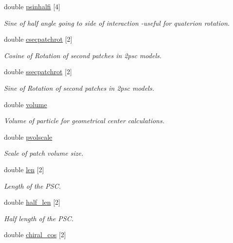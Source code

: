 \begin{DoxyCompactItemize}
double \hyperlink{class_ia__param_a52fcecbb5171074f634ebe68a1037d0d}{psinhalfi} \mbox{[}4\mbox{]}
\begin{DoxyCompactList}\small\item\em Sine of half angle going to side of interaction -\/useful for quaterion rotation. \end{DoxyCompactList}\item 
double \hyperlink{class_ia__param_a7f94789a785201573c04d8c5e71dc9fa}{csecpatchrot} \mbox{[}2\mbox{]}
\begin{DoxyCompactList}\small\item\em Cosine of Rotation of second patches in 2psc models. \end{DoxyCompactList}\item 
double \hyperlink{class_ia__param_a14afc5f0a2e7842923345b3724e329f2}{ssecpatchrot} \mbox{[}2\mbox{]}
\begin{DoxyCompactList}\small\item\em Sine of Rotation of second patches in 2psc models. \end{DoxyCompactList}\item 
double \hyperlink{class_ia__param_af19168047d88497117c70ff6672df1bf}{volume}
\begin{DoxyCompactList}\small\item\em Volume of particle for geometrical center calculations. \end{DoxyCompactList}\item 
double \hyperlink{class_ia__param_ae90674c64fb9e8d68e964114bb029709}{pvolscale}
\begin{DoxyCompactList}\small\item\em Scale of patch volume size. \end{DoxyCompactList}\item 
double \hyperlink{class_ia__param_a50f385d02c6d6c4dabec2c27f552b358}{len} \mbox{[}2\mbox{]}
\begin{DoxyCompactList}\small\item\em Length of the P\+S\+C. \end{DoxyCompactList}\item 
double \hyperlink{class_ia__param_a2cccc1246cdc72d8b88a747efdfd4f70}{half\+\_\+len} \mbox{[}2\mbox{]}
\begin{DoxyCompactList}\small\item\em Half length of the P\+S\+C. \end{DoxyCompactList}\item 
double \hyperlink{class_ia__param_aca5d2f928a51400f45ba6d3b1370b586}{chiral\+\_\+cos} \mbox{[}2\mbox{]}

\end{DoxyCompactItemize}
